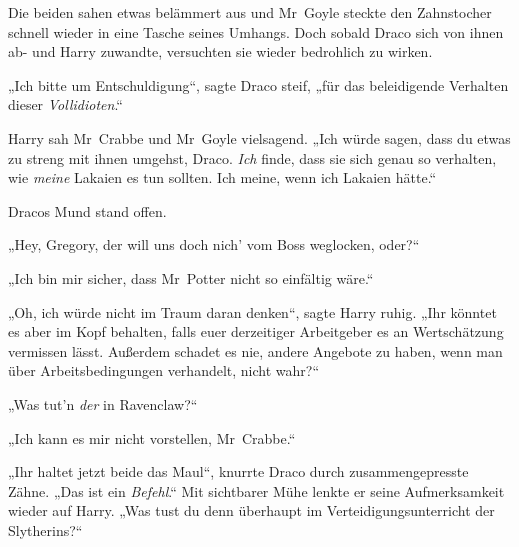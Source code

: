 Die beiden sahen etwas belämmert aus und Mr~Goyle steckte den Zahnstocher schnell wieder in eine Tasche seines Umhangs. Doch sobald Draco sich von ihnen ab- und Harry zuwandte, versuchten sie wieder bedrohlich zu wirken.

„Ich bitte um Entschuldigung“, sagte Draco steif, „für das beleidigende Verhalten dieser \emph{Vollidioten}.“

Harry sah Mr~Crabbe und Mr~Goyle vielsagend. „Ich würde sagen, dass du etwas zu streng mit ihnen umgehst, Draco. \emph{Ich} finde, dass sie sich genau so verhalten, wie \emph{meine} Lakaien es tun sollten. Ich meine, wenn ich Lakaien hätte.“

Dracos Mund stand offen.

„Hey, Gregory, der will uns doch nich’ vom Boss weglocken, oder?“

„Ich bin mir sicher, dass Mr~Potter nicht so einfältig wäre.“

„Oh, ich würde nicht im Traum daran denken“, sagte Harry ruhig. „Ihr könntet es aber im Kopf behalten, falls euer derzeitiger Arbeitgeber es an Wertschätzung vermissen lässt. Außerdem schadet es nie, andere Angebote zu haben, wenn man über Arbeitsbedingungen verhandelt, nicht wahr?“

„Was tut’n \emph{der} in Ravenclaw?“

„Ich kann es mir nicht vorstellen, Mr~Crabbe.“

„Ihr haltet jetzt beide das Maul“, knurrte Draco durch zusammengepresste Zähne. „Das ist ein \emph{Befehl}.“ Mit sichtbarer Mühe lenkte er seine Aufmerksamkeit wieder auf Harry. „Was tust du denn überhaupt im Verteidigungsunterricht der Slytherins?“

